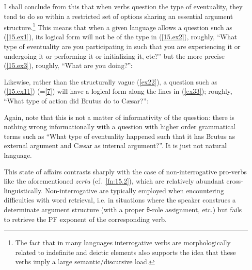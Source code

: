 \documentclass[output=paper]{langsci/langscibook}
\begin{document}
I shall conclude from this that when verbs question the type of eventuality,
they tend to do so within a restricted set of options sharing an essential
argument structure.\footnote{The fact that in many languages interrogative
verbs are morphologically related to indefinite and deictic elements
\citep[cf.][]{hagege2008} also supports the idea that these verbs imply
a large semantic/discursive load.} This means that when a given language allows
a question such as (\ref{15.ex1}), its logical form will not be of the type in
(\ref{15.ex2}), roughly, ``What type of eventuality are you participating in such
that you are experiencing it or undergoing it or performing it or initializing
it, etc?'' but the more precise (\ref{15.ex3}), roughly, ``What are you doing?'':

\begin{exe}
\ex
\begin{xlista}
\label{15.ex1}
\label{15.ex2}
\label{15.ex3}
\end{xlista}
\end{exe}

Likewise, rather than the structurally vague (\ref{ex22}), a question such as
(\ref{15.ex11}) (=\ref{7}) will have a logical form along the lines in
(\ref{ex33}); roughly, ``What type of action did Brutus do to C\ae{}sar?'':

\begin{exe}
\ex
\begin{xlista}
\label{15.ex11}
\label{ex22}
\label{ex33}
\end{xlista}
\end{exe}

Again, note that this is not a matter of informativity of the question: there
is nothing wrong informationally with a question with higher order grammatical
terms such as ``What type of eventuality happened such that it has Brutus as
external argument and C\ae{}sar as internal argument?''. It is just not natural
language.

This state of affairs contrasts sharply with the case of non-interrogative
pro-verbs like the aforementioned  \emph{zertu} (cf.~\cref{fn:15.2}), which
are relatively abundant cross-linguistically. Non-interrogative  are
typically employ\-ed when encountering difficulties with word retrieval,
i.e. in situations where the speaker construes a determinate argument
structure (with a proper θ-role assignment, etc.) but fails to retrieve the PF
exponent of the corresponding verb.
\end{document}
